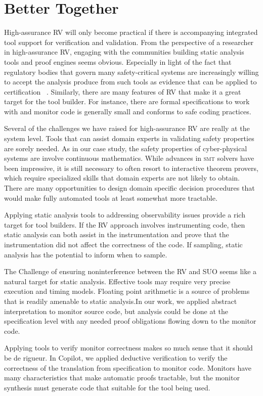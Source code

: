 \section{Better Together}\label{sec:oportunities} 
High-assurance RV will only become practical if there is accompanying
integrated tool support for verification and validation.  From the
perspective of a researcher in high-assurance RV, engaging with the
communities building static analysis tools and proof engines seems
obvious.  Especially in light of the fact that regulatory bodies that
govern many safety-critical systems are increasingly willing to accept
the analysis produce from such tools as evidence that can be applied to
certification ~\cite{DO333}. Similarly, there are many features of RV
that make it a great target for the tool builder. For instance, there are formal
specifications to work with  and monitor code is generally small and
conforms to safe coding practices. 

 
Several of the challenges we have raised for high-assurance RV are
really at the system level. Tools that can assist domain experts in
validating safety properties are sorely needed.  As in our case study,
the safety properties of cyber-physical systems are involve continuous
mathematics. While advances in \textsc{smt} solvers have been
impressive, it is still necessary to often resort to interactive
theorem provers, which require specialized skills that domain experts
are not likely to obtain. There are many opportunities to design
domain specific decision procedures that would make fully automated
tools at least somewhat more tractable.  

 Applying static analysis tools to addressing observability
 issues provide a rich target for tool builders. If the RV approach involves
instrumenting code, then static analysis can both assist in the
instrumentation and prove that the instrumentation did not affect the
correctness of the code. If sampling, static analysis has the
potential to inform when to sample. 

The Challenge of ensuring noninterference between the RV and SUO seems
like a natural target for static analysis. Effective tools may require
very precise execution and timing models.  Floating point arithmetic
is a source of problems that is readily amenable to static analysis.In
our work, we applied abstract interpretation to monitor source code,
but  analysis could be done at the specification level with any needed
proof obligations flowing down to the monitor code. 

Applying tools to verify monitor correctness makes so much sense that
it should be de rigueur.  In Copilot, we applied deductive
verification to verify the correctness of the translation from
specification to monitor code.  Monitors have many characteristics
that make automatic proofs tractable, but the monitor synthesis must
generate code that suitable for the tool being used.   